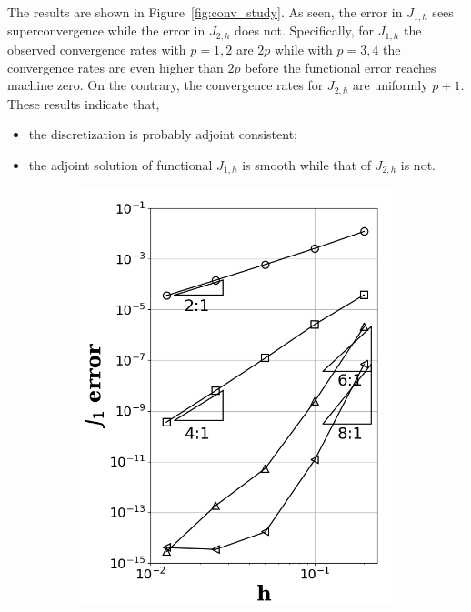 \documentclass[a4paper]{article}
\begin{document}
The results are shown in Figure~\ref{fig:conv_study}. As seen, the error in $J_{1,h}$ sees superconvergence while the error in $J_{2,h}$ does not. Specifically, for $J_{1,h}$ the observed convergence rates with $p=1,2$ are $2p$ while with $p=3,4$ the convergence rates are even higher than $2p$ before the functional error reaches machine zero.
On the contrary, the convergence rates for $J_{2,h}$ are uniformly $p+1$. These results indicate that,
\begin{itemize}
  \item the discretization is probably adjoint consistent;
  \item the adjoint solution of functional $J_{1,h}$ is smooth while that of $J_{2,h}$ is not.
\end{itemize}

\begin{figure}[!htbp]
	\centering
	\begin{subfigure}{0.45\textwidth}
		\centering
		\includegraphics[width=1.0\linewidth]{figures/implicit_J1_error.png}

\end{subfigure}
\end{figure}
\end{document}
